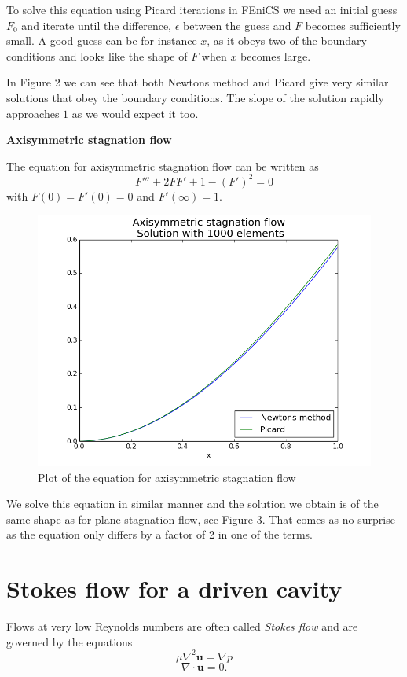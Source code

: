 \documentclass[11pt,a4paper,english]{article}
\numberwithin{equation}{section}
\begin{document}
To solve this equation using Picard iterations in FEniCS we need an initial guess $F_0$ and iterate until the difference, $\epsilon$ between the guess and $F$ becomes sufficiently small. A good guess can be  for instance $x$, as it obeys two of the boundary conditions and looks like the shape of $F$ when $x$ becomes large.   

In Figure 2 we can see that both Newtons method and Picard give very similar solutions that obey the boundary conditions. The slope of the solution rapidly approaches $1$ as we would expect it too.     

\textbf{Axisymmetric stagnation flow}

The equation for axisymmetric stagnation flow can be written as
\begin{equation}
F''' + 2FF' + 1 - (F')^2 = 0
\end{equation}
with $F(0) = F'(0) = 0$ and $F'(\infty)=1$.

\begin{figure}[h!]
\begin{center}
  \includegraphics[scale=0.4]{axisym_stag.png}
  \end{center}
  \caption{Plot of the equation for axisymmetric stagnation flow}
  \label{fig:stokes_square}
\end{figure}

We solve this equation in similar manner and the solution we obtain is of the same shape as for plane stagnation flow, see Figure 3. That comes as no surprise as the equation only differs by a factor of 2 in one of the terms.   

\section{Stokes flow for a driven cavity}
Flows at very low Reynolds numbers are often called \emph{Stokes flow} and are governed by the equations 
\begin{equation}
\mu \nabla^2 \mathbf{u} = \nabla p
\end{equation}
\begin{equation}
\nabla \cdot \mathbf{u} = 0.
\end{equation}
\end{document}
